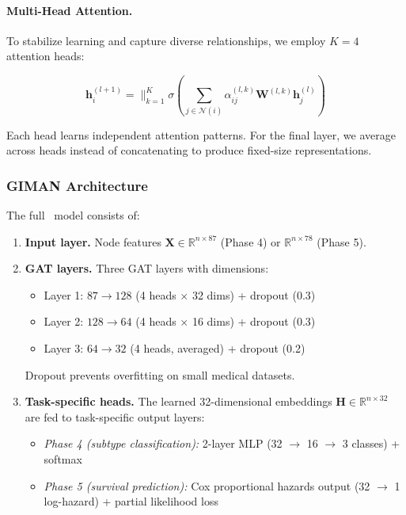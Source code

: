 \paragraph{Multi-Head Attention.}
To stabilize learning and capture diverse relationships, we employ $K=4$ attention heads:

\begin{equation}
    \mathbf{h}_i^{(l+1)} = \|_{k=1}^K \sigma \left( \sum_{j \in \mathcal{N}(i)} \alpha_{ij}^{(l,k)} \mathbf{W}^{(l,k)} \mathbf{h}_j^{(l)} \right)
\end{equation}

Each head learns independent attention patterns. For the final layer, we average across heads instead of concatenating to produce fixed-size representations.

\subsubsection{GIMAN Architecture}

The full \giman\ model consists of:

\begin{enumerate}
    \item \textbf{Input layer.} Node features $\mathbf{X} \in \mathbb{R}^{n \times 87}$ (Phase 4) or $\mathbb{R}^{n \times 78}$ (Phase 5).
    
    \item \textbf{GAT layers.} Three GAT layers with dimensions:
    \begin{itemize}
        \item Layer 1: $87 \to 128$ (4 heads $\times$ 32 dims) + dropout (0.3)
        \item Layer 2: $128 \to 64$ (4 heads $\times$ 16 dims) + dropout (0.3)
        \item Layer 3: $64 \to 32$ (4 heads, averaged) + dropout (0.2)
    \end{itemize}
    Dropout prevents overfitting on small medical datasets\cite{srivastava2014dropout}.
    
    \item \textbf{Task-specific heads.} The learned 32-dimensional embeddings $\mathbf{H} \in \mathbb{R}^{n \times 32}$ are fed to task-specific output layers:
    \begin{itemize}
        \item \textit{Phase 4 (subtype classification):} 2-layer MLP (32 $\to$ 16 $\to$ 3 classes) + softmax
        \item \textit{Phase 5 (survival prediction):} Cox proportional hazards output (32 $\to$ 1 log-hazard) + partial likelihood loss\cite{faraggi1995neural}
    \end{itemize}
\end{enumerate}

